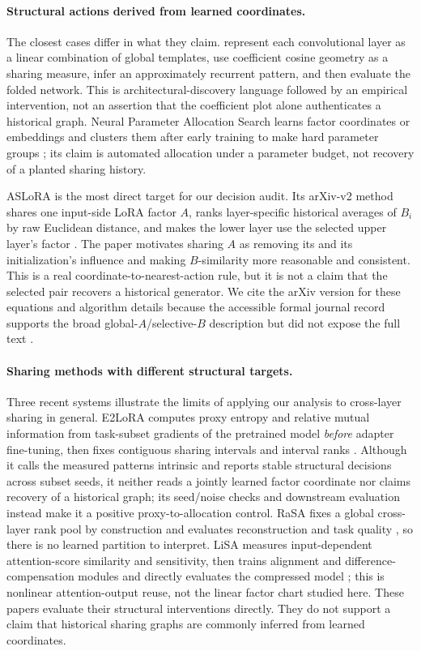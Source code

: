 \paragraph{Structural actions derived from learned coordinates.}
The closest cases differ in what they claim.  \citet{savarese2019learning}
represent each convolutional layer as a linear combination of global
templates, use coefficient cosine geometry as a sharing measure, infer an
approximately recurrent pattern, and then evaluate the folded network.  This
is architectural-discovery language followed by an empirical intervention,
not an assertion that the coefficient plot alone authenticates a historical
graph.  Neural Parameter Allocation Search learns factor coordinates or
embeddings and clusters them after early training to make hard parameter
groups \citep{plummer2022neural}; its claim is automated allocation under a
parameter budget, not recovery of a planted sharing history.

ASLoRA is the most direct target for our decision audit.  Its arXiv-v2 method
shares one input-side LoRA factor $A$, ranks layer-specific historical
averages of $B_i$ by raw Euclidean distance, and makes the lower layer use the
selected upper layer's factor \citep{hu2024aslorav2}.  The paper motivates
sharing $A$ as removing its and its initialization's influence and making
$B$-similarity more reasonable and consistent.  This is a real
coordinate-to-nearest-action rule, but it is not a claim that the selected
pair recovers a historical generator.  We cite the arXiv version for these
equations and algorithm details because the accessible formal journal record
supports the broad global-$A$/selective-$B$ description but did not expose
the full text \citep{hu2026aslora}.

\paragraph{Sharing methods with different structural targets.}
Three recent systems illustrate the limits of applying our analysis to
cross-layer sharing in general.
E2LoRA computes proxy entropy and relative mutual information from
task-subset gradients of the pretrained model \emph{before} adapter
fine-tuning, then fixes contiguous sharing intervals and interval ranks
\citep{li2026e2lora}.  Although it calls the measured patterns intrinsic and
reports stable structural decisions across subset seeds, it neither reads a
jointly learned factor coordinate nor claims recovery of a historical graph;
its seed/noise checks and downstream evaluation instead make it a positive
proxy-to-allocation control.  RaSA fixes a global cross-layer rank pool by
construction and evaluates reconstruction and task quality
\citep{he2025rasa}, so there is no learned partition to interpret.  LiSA
measures input-dependent attention-score similarity and sensitivity, then
trains alignment and difference-compensation modules and directly evaluates
the compressed model \citep{mu2026lisa}; this is nonlinear attention-output
reuse, not the linear factor chart studied here.  These papers evaluate their structural interventions directly. They do
not support a claim that historical sharing graphs are commonly inferred
from learned coordinates.

